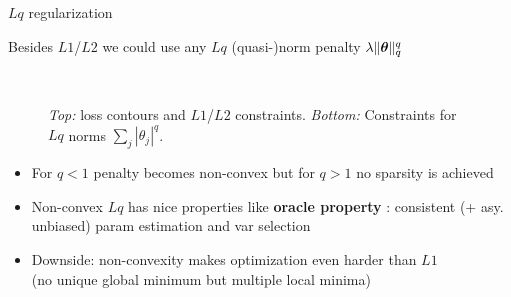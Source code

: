 \documentclass[11pt,compress,t,notes=noshow, xcolor=table]{beamer}
\begin{document}
\begin{vbframe}{$Lq$ regularization }

Besides $L1$/$L2$ we could use any $Lq$ (quasi-)norm penalty $\lambda \Vert \bm{\theta} \Vert_q^q$ 

\begin{figure}
  \\
\caption{{\scriptsize \textit{Top:} loss contours and $L1$/$L2$ constraints.
\textit{Bottom:} Constraints for $Lq$ norms $\sum_j |\theta_j|^q$.}}
\end{figure}
\vspace{-0.4cm}
{\footnotesize
\begin{itemize}
    \item For $q<1$ penalty becomes non-convex but for $q>1$ no sparsity is achieved
    \item Non-convex $Lq$ has nice properties like \textbf{oracle property} : consistent (+ asy. unbiased) param estimation and var selection
    \item Downside: non-convexity makes optimization even harder than $L1$\\
    (no unique global minimum but multiple local minima)
\end{itemize}
}
\end{vbframe}
\end{document}

